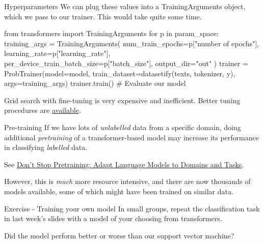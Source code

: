 \documentclass[
  10pt,
  ignorenonframetext,
  aspectratio=169]{beamer}
\newenvironment{Shaded}{\begin{snugshade}}{\end{snugshade}}
\newcommand{\CommentTok}[1]{\textcolor[rgb]{0.50,0.62,0.50}{#1}}
\newcommand{\ControlFlowTok}[1]{\textcolor[rgb]{0.94,0.87,0.69}{#1}}
\newcommand{\ImportTok}[1]{\textcolor[rgb]{0.80,0.80,0.80}{#1}}
\newcommand{\KeywordTok}[1]{\textcolor[rgb]{0.94,0.87,0.69}{#1}}
\newcommand{\NormalTok}[1]{\textcolor[rgb]{0.80,0.80,0.80}{#1}}
\newcommand{\OperatorTok}[1]{\textcolor[rgb]{0.94,0.94,0.82}{#1}}
\newcommand{\StringTok}[1]{\textcolor[rgb]{0.80,0.58,0.58}{#1}}
\begin{document}
\begin{frame}[fragile]{Hyperparameters}
\protect\hypertarget{hyperparameters-1}{}
We can plug these values into a TrainingArguments object, which we pass
to our trainer. This would take quite some time.

\medskip
\scriptsize

\begin{Shaded}
\begin{Highlighting}[]
\ImportTok{from}\NormalTok{ transformers }\ImportTok{import}\NormalTok{ TrainingArguments}
\ControlFlowTok{for}\NormalTok{ p }\KeywordTok{in}\NormalTok{ param\_space:}
\NormalTok{    training\_args }\OperatorTok{=}\NormalTok{ TrainingArguments(}
\NormalTok{        num\_train\_epochs}\OperatorTok{=}\NormalTok{p[}\StringTok{"number of epochs"}\NormalTok{],}
\NormalTok{        learning\_rate}\OperatorTok{=}\NormalTok{p[}\StringTok{"learning\_rate"}\NormalTok{],}
\NormalTok{        per\_device\_train\_batch\_size}\OperatorTok{=}\NormalTok{p[}\StringTok{"batch\_size"}\NormalTok{],}
\NormalTok{        output\_dir}\OperatorTok{=}\StringTok{"out"}
\NormalTok{    )}
\NormalTok{    trainer }\OperatorTok{=}\NormalTok{ ProbTrainer(model}\OperatorTok{=}\NormalTok{model, train\_dataset}\OperatorTok{=}\NormalTok{datasetify(texts, tokenizer, y), args}\OperatorTok{=}\NormalTok{training\_args)}
\NormalTok{    trainer.train()}
    \CommentTok{\# Evaluate our model}
\end{Highlighting}
\end{Shaded}

Grid search with fine-tuning is very expensive and inefficient. Better
tuning procedures are
\href{https://huggingface.co/docs/transformers/hpo_train}{available}.
\end{frame}

\begin{frame}{Pre-training}
\protect\hypertarget{pre-training}{}
If we have lots of \emph{unlabelled} data from a specific domain, doing
additional \emph{pretraining} of a transformer-based model may increase
its performance in classifying \emph{labelled} data.

See \href{https://aclanthology.org/2020.acl-main.740/}{Don't Stop
Pretraining: Adapt Language Models to Domains and Tasks}.

However, this is \emph{much} more resource intensive, and there are now
thousands of models available, some of which might have been trained on
similar data.
\end{frame}

\begin{frame}{Exercise - Training your own model}
\protect\hypertarget{exercise---training-your-own-model}{}
In small groups, repeat the classification task in last week's slides
with a model of your choosing from transformers.

Did the model perform better or worse than our support vector machine?
\end{frame}
\end{document}

